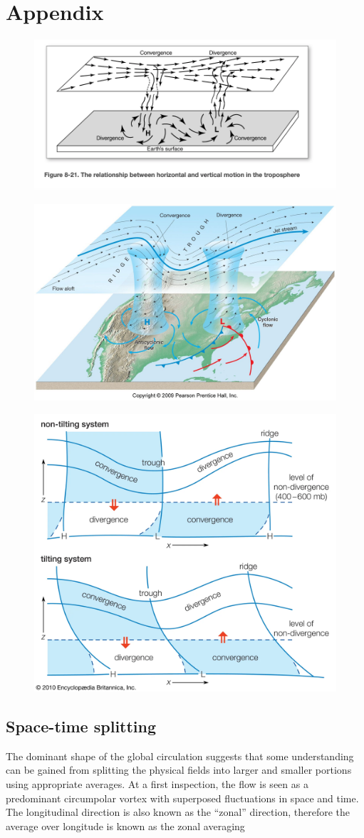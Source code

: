 \chapter{Appendix}\label{ch:appendixA}
\begin{figure}
    \centering
    \includegraphics[width=0.5\linewidth]{uploads/relationship between lower and vertical motion.png}
\end{figure}
\begin{figure}
    \centering
    \includegraphics[width=0.5\linewidth]{through and divergence.png}
\end{figure}
\begin{figure}
    \centering
    \includegraphics[width=0.5\linewidth]{uploads/conv and div.png}
\end{figure}

\section{Space-time splitting}
The dominant shape of the global circulation suggests that some understanding can be gained from splitting the physical fields into larger and smaller portions using appropriate averages. At a first inspection, the flow is seen as a predominant circumpolar vortex with superposed fluctuations in space and time. The longitudinal direction is also known as the “zonal” direction, therefore the average over longitude is known as the zonal averaging 

